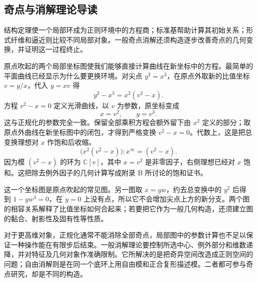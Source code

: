 \subsection{奇点与消解理论导读}
\label{b3:subsec:D04:04}

结构定理使一个局部环成为正则环境中的方程商；标准基帮助计算其初始关系；形式纤维和逼近则比较不同局部对象。一般奇点消解还须构造逐步改善奇点的几何变换，并证明这一过程终止。

\ProseParagraphBreak
原点吹起的两个局部坐标图使我们能够直接计算曲线在新坐标中的方程。最简单的平面曲线已经显示为什么要更换环境。对尖点 \(y^2=x^3\)，在原点外取新的比值坐标 \(v=y/x\)，代入 \(y=xv\) 得
\[
	y^2-x^3=x^2(v^2-x).
\]
方程 \(v^2-x=0\) 定义光滑曲线，以 \(v\) 为参数，原坐标变成
\[
	x=v^2,\qquad y=v^3.
\]
这与正规化的参数完全一致。保留全部乘积方程会额外留下由 \(x^2\) 定义的部分；取原点外曲线在新坐标图中的闭包，才得到严格变换 \(v^2-x=0\)。代数上，这是把总变换理想对 \(x\) 作饱和后收缩。
\[
	\bigl(x^2(v^2-x)\bigr):x^\infty=(v^2-x).
\]
因为模 \((v^2-x)\) 的环为 \(\mathbb C[v]\)，其中 \(x=v^2\) 是非零因子，右侧理想已经对 \(x\) 饱和。这把除去例外因子的几何计算写成附录 B 所讨论的饱和证书。

\ProseParagraphBreak
这一个坐标图是原点吹起的常见图。另一图取 \(x=yw\)，约去总变换中的 \(y^2\) 后得到 \(1-yw^3=0\)，在 \(y=0\) 上没有点，所以它不会增加尖点上方的新分支。两个图的相容关系解释了比值坐标如何合起来；若要把它作为一般几何构造，还须建立图的黏合、射影性及固有性等性质。

\ProseParagraphBreak
对于更高维对象，正规化通常不能消除全部奇点，局部图中的参数计算也不足以保证一种操作能在有限步后结束。一般消解理论要控制所选中心、例外部分和维数递降，并对特征及几何对象作准确限制。它所解决的是把奇异空间改造成正则空间的问题；自由消解则是在同一个底环上用自由模和正合复形描述模。二者都可参与奇点研究，却是不同的构造。
